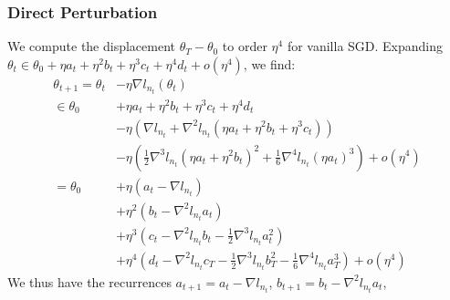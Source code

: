 \documentclass{article}
\newcommand{\wrap}[1]{\left(#1\right)}
\begin{document}
        \subsubsection*{Direct Perturbation}
            We compute the displacement $\theta_T-\theta_0$ to order $\eta^4$ 
            for vanilla SGD.  Expanding
            $
                \theta_t \in \theta_0
                    + \eta a_t + \eta^2 b_t + \eta^3 c_t + \eta^4 d_t 
                    + o(\eta^4)
            $, we find:
            \begin{align*}
                \theta_{t+1}
                =
                \theta_t    &- \eta \nabla l_{n_t} (\theta_t) \\
                \in\theta_0 &+ \eta a_t + \eta^2 b_t + \eta^3 c_t + \eta^4 d_t \\
                            &- \eta \wrap{
                                    \nabla l_{n_t}
                                   +\nabla^2 l_{n_t}             (\eta a_t + \eta^2 b_t + \eta^3 c_t)
                               } \\
                            &- \eta \wrap{
                                    \frac{1}{2} \nabla^3 l_{n_t} (\eta a_t + \eta^2 b_t)^2
                                   +\frac{1}{6} \nabla^4 l_{n_t} (\eta a_t)^3
                               }
                             + o(\eta^4) \\
                =
                \theta_0    &+ \eta   \wrap{a_t - \nabla l_{n_t}} \\
                            &+ \eta^2 \wrap{b_t - \nabla^2 l_{n_t} a_t} \\ 
                            &+ \eta^3 \wrap{
                                   c_t
                                  -\nabla^2 l_{n_t} b_t
                                  -\frac{1}{2} \nabla^3 l_{n_t} a_t^2
                               } \\
                            &+ \eta^4 \wrap{
                                   d_t
                                  -            \nabla^2 l_{n_t} c_T
                                  -\frac{1}{2} \nabla^3 l_{n_t} b_T^2 
                                  -\frac{1}{6} \nabla^4 l_{n_t} a_T^3 
                               }
                             + o(\eta^4)
            \end{align*}
            We thus have the recurrences
            $
                a_{t+1} = a_t - \nabla l_{n_t}
            $,
            $
                b_{t+1} = b_t - \nabla^2 l_{n_t} a_t
            $,
\end{document}
